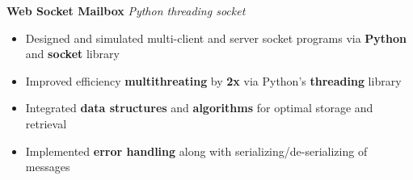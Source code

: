 
\textbf{Web Socket Mailbox {\textbar}}
\textit{
Python
threading
socket
}
\begin{itemize}[itemsep=0pt, topsep=0pt]
\item Designed and simulated multi-client and server socket programs via \textbf{Python} and \textbf{socket} library
\item Improved efficiency \textbf{multithreating} by \textbf{2x} via Python's \textbf{threading} library
\item Integrated \textbf{data structures} and \textbf{algorithms} for optimal storage and retrieval
\item Implemented \textbf{error handling} along with serializing/de-serializing of messages
\end{itemize}




